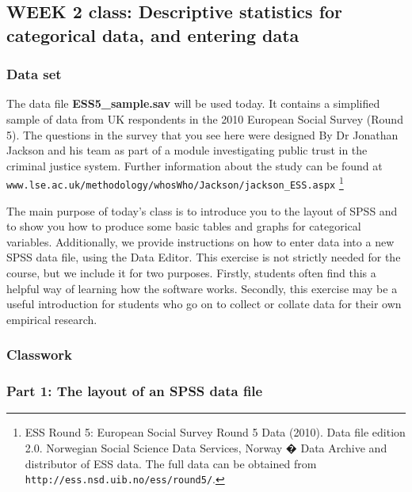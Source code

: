 \documentclass[11pt,a4paper,openany]{book}
\let\rmarkdownfootnote\footnote%
\def\footnote{\protect\rmarkdownfootnote}
\begin{document}
\newpage

\subsection{WEEK 2 class: Descriptive statistics for categorical data,
and entering data}\label{ss-class1}

\subsubsection*{Data set}\label{data-set}

The data file \textbf{ESS5\_sample.sav} will be used today. It contains
a simplified sample of data from UK respondents in the 2010 European
Social Survey (Round 5). The questions in the survey that you see here
were designed By Dr Jonathan Jackson and his team as part of a module
investigating public trust in the criminal justice system. Further
information about the study can be found at\\
\texttt{www.lse.ac.uk/methodology/whosWho/Jackson/jackson\_ESS.aspx}
\footnote{ESS Round 5: European Social Survey Round 5 Data (2010). Data
  file edition 2.0. Norwegian Social Science Data Services, Norway �
  Data Archive and distributor of ESS data. The full data can be
  obtained from \texttt{http://ess.nsd.uib.no/ess/round5/}.}

The main purpose of today's class is to introduce you to the layout of
SPSS and to show you how to produce some basic tables and graphs for
categorical variables. Additionally, we provide instructions on how to
enter data into a new SPSS data file, using the Data Editor. This
exercise is not strictly needed for the course, but we include it for
two purposes. Firstly, students often find this a helpful way of
learning how the software works. Secondly, this exercise may be a useful
introduction for students who go on to collect or collate data for their
own empirical research.

\subsubsection*{Classwork}\label{classwork}

\subsubsection*{Part 1: The layout of an SPSS data
file}\label{part-1-the-layout-of-an-spss-data-file}
\end{document}
